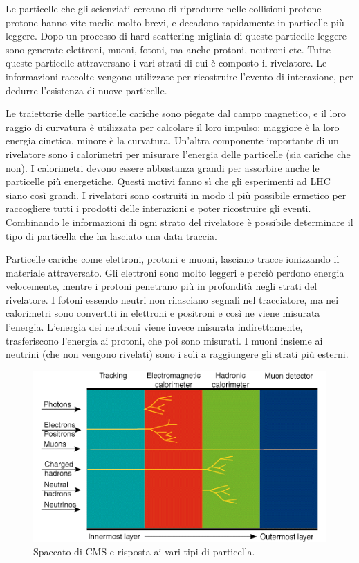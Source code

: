 Le particelle che gli scienziati cercano di riprodurre nelle collisioni protone-protone hanno vite medie molto brevi, e decadono rapidamente in particelle più leggere. Dopo un processo di hard-scattering migliaia di queste particelle leggere sono generate elettroni, muoni, fotoni, ma anche protoni, neutroni etc. Tutte queste particelle attraversano i vari strati di cui è composto il rivelatore. 
Le informazioni raccolte vengono utilizzate per ricostruire l'evento di interazione, per  dedurre l'esistenza di nuove particelle.


Le traiettorie delle particelle cariche sono piegate dal campo magnetico, e il loro raggio di curvatura è utilizzata per calcolare il loro impulso: maggiore è la loro energia cinetica, minore è la curvatura. Un'altra componente importante di un rivelatore sono i calorimetri per misurare l'energia delle particelle (sia cariche che non). 
I calorimetri devono essere abbastanza grandi per assorbire anche le particelle più energetiche. Questi motivi fanno sì che gli esperimenti ad LHC siano così grandi. I rivelatori sono costruiti in modo il più possibile ermetico per raccogliere tutti i prodotti delle interazioni e poter ricostruire gli eventi. 
Combinando le informazioni di ogni strato del rivelatore è possibile determinare il tipo di particella che ha lasciato una data traccia.

Particelle cariche come elettroni, protoni e muoni, lasciano tracce ionizzando il materiale attraversato. Gli elettroni sono molto leggeri e perciò perdono energia velocemente, mentre i protoni penetrano più in profondità negli strati del rivelatore. I fotoni essendo neutri non rilasciano segnali nel tracciatore, ma nei calorimetri sono convertiti in elettroni e positroni e così ne viene misurata l'energia. 
L'energia dei neutroni viene invece misurata indirettamente, trasferiscono l'energia ai protoni, che poi sono misurati. I muoni insieme ai neutrini (che non vengono rivelati) sono i soli a raggiungere gli strati più esterni.


\begin{figure}
\centering
\includegraphics[scale=0.7]{Immagini/CMSinterazione}
\caption{Spaccato di CMS e risposta ai vari tipi di particella.}
\label{CMSinterazione}
\end{figure}

